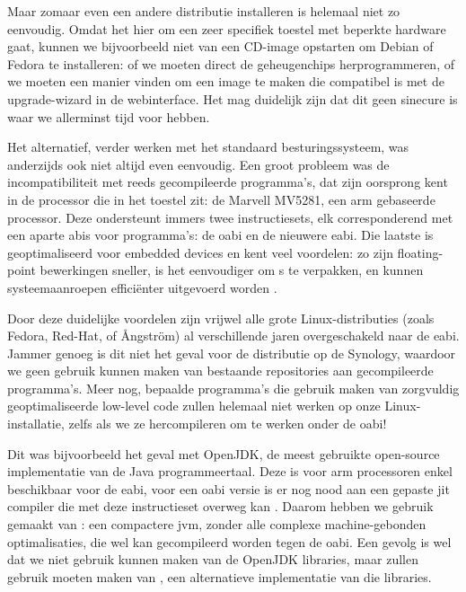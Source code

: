 Maar zomaar even een andere distributie installeren is helemaal niet zo eenvoudig. Omdat het hier om een zeer specifiek toestel met beperkte hardware gaat, kunnen we bijvoorbeeld niet van een CD-image opstarten om Debian of Fedora te installeren: of we moeten direct de geheugenchips herprogrammeren, of we moeten een manier vinden om een image te maken die compatibel is met de upgrade-wizard in de webinterface. Het mag duidelijk zijn dat dit geen sinecure is waar we allerminst tijd voor hebben.

Het alternatief, verder werken met het standaard besturingssysteem, was anderzijds ook niet altijd even eenvoudig. Een groot probleem was de incompatibiliteit met reeds gecompileerde programma's, dat zijn oorsprong kent in de processor die in het toestel zit: de Marvell MV5281, een \ac{arm} gebaseerde processor. Deze ondersteunt immers twee instructiesets, elk corresponderend met een aparte \acp{abi} voor programma's: de \ac{oabi} en de nieuwere \ac{eabi}. Die laatste is geoptimaliseerd voor embedded devices en kent veel voordelen: zo zijn floating-point bewerkingen sneller, is het eenvoudiger om s te verpakken, en kunnen systeemaanroepen efficiënter uitgevoerd worden \citep{linuxfordevices:eabi}.

Door deze duidelijke voordelen zijn vrijwel alle grote Linux-distributies (zoals Fedora, Red-Hat, of Ångström) al verschillende jaren overgeschakeld naar de \ac{eabi}. Jammer genoeg is dit niet het geval voor de distributie op de Synology, waardoor we geen gebruik kunnen maken van bestaande repositories aan gecompileerde programma's. Meer nog, bepaalde programma's die gebruik maken van zorgvuldig geoptimaliseerde low-level code zullen helemaal niet werken op onze Linux-installatie, zelfs als we ze hercompileren om te werken onder de \ac{oabi}!

Dit was bijvoorbeeld het geval met OpenJDK, de meest gebruikte open-source implementatie van de Java programmeertaal. Deze is voor \ac{arm} processoren enkel beschikbaar voor de \ac{eabi}, voor een \ac{oabi} versie is er nog nood aan een gepaste \ac{jit} compiler die met deze instructieset overweg kan \citep{synology:java}. Daarom hebben we gebruik gemaakt van : een compactere \ac{jvm}, zonder alle complexe machine-gebonden optimalisaties, die wel kan gecompileerd worden tegen de \ac{oabi}. Een gevolg is wel dat we niet gebruik kunnen maken van de OpenJDK libraries, maar zullen gebruik moeten maken van , een alternatieve implementatie van die libraries.

